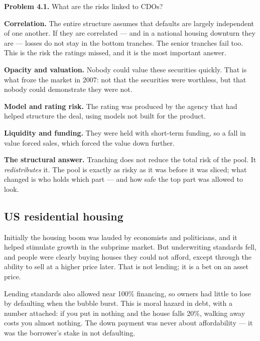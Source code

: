 \documentclass[11pt,a4paper]{article}
\newcommand{\keylab}[1]{\textcolor{ifclay}{\textbf{#1}}}
\begin{document}
\begin{probbox}
\textbf{Problem 4.1.} What are the risks linked to CDOs?
\end{probbox}

\textbf{Correlation.} The entire structure assumes that defaults are largely
independent of one another. If they are correlated --- and in a national housing
downturn they are --- losses do not stay in the bottom tranches. The senior
tranches fail too. This is the risk the ratings missed, and it is the most
important answer.

\textbf{Opacity and valuation.} Nobody could value these securities quickly.
That is what froze the market in 2007: not that the securities were worthless,
but that nobody could demonstrate they were not.

\textbf{Model and rating risk.} The rating was produced by the agency that had
helped structure the deal, using models not built for the product.

\textbf{Liquidity and funding.} They were held with short-term funding, so a
fall in value forced sales, which forced the value down further.

\begin{keybox}
\keylab{The structural answer.} Tranching does not reduce the total risk of the
pool. It \emph{redistributes} it. The pool is exactly as risky as it was before
it was sliced; what changed is who holds which part --- and how safe the top
part was allowed to look.
\end{keybox}

\subsection*{US residential housing}

Initially the housing boom was lauded by economists and politicians, and it
helped stimulate growth in the subprime market. But underwriting standards fell,
and people were clearly buying houses they could not afford, except through the
ability to sell at a higher price later. That is not lending; it is a bet on an
asset price.

Lending standards also allowed near 100\% financing, so owners had little to
lose by defaulting when the bubble burst. This is moral hazard in debt, with a
number attached: if you put in nothing and the house falls 20\%, walking away
costs you almost nothing. The down payment was never about affordability --- it
was the borrower's stake in not defaulting.
\end{document}
